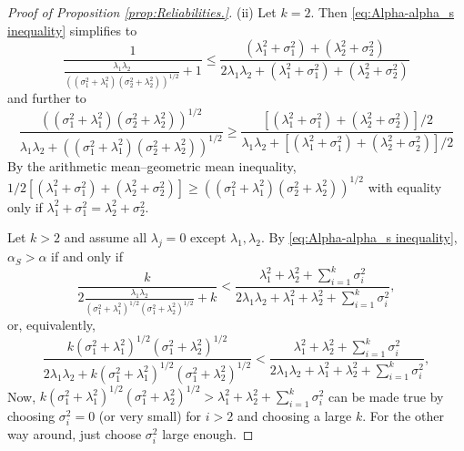 \documentclass[twoside]{article}
\DeclareMathOperator{\tsum}{\textstyle \sum}
\renewcommand{\sqrt}[1]{{(#1)^{1/2}}}
\begin{document}
\begin{proof}[Proof of Proposition \ref{prop:Reliabilities.}]
(ii) Let $k=2$. Then \eqref{eq:Alpha-alpha_s inequality} simplifies to
\[
\frac{1}{\frac{\lambda_{1}\lambda_{2}}{\sqrt{(\sigma_{1}^{2}+\lambda_{1}^{2})(\sigma_{2}^{2}+\lambda_{2}^{2})}}+1}\leq\frac{(\lambda_{1}^{2}+\sigma_{1}^{2})+(\lambda_{2}^{2}+\sigma_{2}^{2})}{2\lambda_{1}\lambda_{2}+(\lambda_{1}^{2}+\sigma_{1}^{2})+(\lambda_{2}^{2}+\sigma_{2}^{2})}
\]
and further to
\begin{equation*}
\frac{\sqrt{(\sigma_{1}^{2}+\lambda_{1}^{2})(\sigma_{2}^{2}+\lambda_{2}^{2})}}{\lambda_{1}\lambda_{2}+\sqrt{(\sigma_{1}^{2}+\lambda_{1}^{2})(\sigma_{2}^{2}+\lambda_{2}^{2})}} \geq \frac{[(\lambda_{1}^{2}+\sigma_{1}^{2})+(\lambda_{2}^{2}+\sigma_{2}^{2})]/2}{\lambda_{1}\lambda_{2}+[(\lambda_{1}^{2}+\sigma_{1}^{2})+(\lambda_{2}^{2}+\sigma_{2}^{2})]/2}
\end{equation*}
By the arithmetic mean--geometric mean inequality, $1/2[(\lambda_{1}^{2}+\sigma_{1}^{2})+(\lambda_{2}^{2}+\sigma_{2}^{2})]\geq\sqrt{(\sigma_{1}^{2}+\lambda_{1}^{2})(\sigma_{2}^{2}+\lambda_{2}^{2})}$
with equality only if $\lambda_{1}^{2}+\sigma_{1}^{2}=\lambda_{2}^{2}+\sigma_{2}^{2}$.

Let $k>2$ and assume all $\lambda_{j}=0$
except $\lambda_{1},\lambda_{2}$. By \eqref{eq:Alpha-alpha_s inequality}, $\alpha_S > \alpha$ if and
only if
\[
\frac{k}{2\frac{\lambda_{1}\lambda_{2}}{\sqrt{\sigma_{1}^{2}+\lambda_{1}^{2}}\sqrt{\sigma_{1}^{2}+\lambda_{2}^{2}}}+k}<\frac{\lambda_1^2 + \lambda_2^2 + \tsum_{i=1}^{k}\sigma_{i}^{2}}{2\lambda_{1}\lambda_{2}+\lambda_1^2 + \lambda_2^2 + \tsum_{i=1}^{k}\sigma_{i}^{2}},
\]
or, equivalently,
\begin{equation*}
\frac{k\sqrt{\sigma_{1}^{2}+\lambda_{1}^{2}}\sqrt{\sigma_{1}^{2}+\lambda_{2}^{2}}}{2\lambda_{1}\lambda_{2}+k\sqrt{\sigma_{1}^{2}+\lambda_{1}^{2}}\sqrt{\sigma_{1}^{2}+\lambda_{2}^{2}}} < \frac{\lambda_1^2 + \lambda_2^2 + \tsum_{i=1}^{k}\sigma_{i}^{2}}{2\lambda_{1}\lambda_{2}+\lambda_1^2 + \lambda_2^2 + \tsum_{i=1}^{k}\sigma_{i}^{2}},
\end{equation*}
Now, $k\sqrt{\sigma_{1}^{2}+\lambda_{1}^{2}}\sqrt{\sigma_{1}^{2}+\lambda_{2}^{2}}>\lambda_1^2 + \lambda_2^2 + \tsum_{i=1}^{k}\sigma_{i}^{2}$
can be made true by choosing $\sigma_{i}^{2}=0$ (or very small) for $i>2$ and choosing a large $k$. For the
other way around, just choose $\sigma_{i}^{2}$ large enough.


\end{proof}
\end{document}

